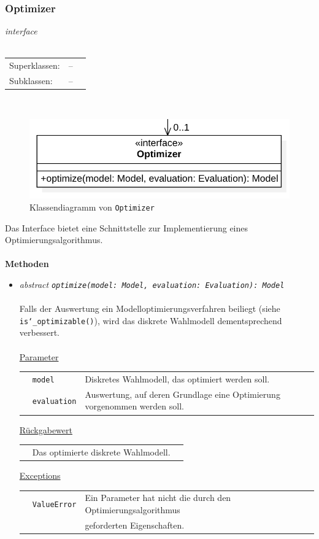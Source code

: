 \documentclass{article}
\begin{document}
\newpage
\subsubsection*{\large{\textbf{Optimizer}\label{cls:Optimizer}}}
\textit{\flqq{}interface\frqq}\normalsize\\\\
\begin{tabular}{lll}
 Superklassen: & --\\
 Subklassen: & --
\end{tabular}\\
\begin{figure}[H]%
    \centering
    \includegraphics[width=13cm]{entwurf/Entwurf_dokument/img/cls/model/Optimizer.png}
    \caption{Klassendiagramm von \texttt{Optimizer}}
\end{figure}

Das Interface bietet eine Schnittstelle zur Implementierung eines Optimierungsalgorithmus.
\\\\

\textbf{Methoden}
\begin{itemize}\setlength\itemsep{3em}
\item \textit{\flqq{}abstract\frqq} \texttt{\textit{optimize(model: Model, evaluation: Evaluation): Model}}\\\\
Falls der Auswertung ein Modelloptimierungsverfahren beiliegt (siehe \texttt{is\char`_optimizable()}), wird das diskrete Wahlmodell dementsprechend verbessert.\\\\
\underline{Parameter}\\
\begin{tabular}{lll}
 & \texttt{model} & Diskretes Wahlmodell, das optimiert werden soll.\\
 & \texttt{evaluation} & Auswertung, auf deren Grundlage eine Optimierung vorgenommen werden soll.
\end{tabular}

\underline{Rückgabewert}\\
\begin{tabular}{lll}
 & Das optimierte diskrete Wahlmodell.\\
\end{tabular}

\underline{Exceptions}\\
\begin{tabular}{lll}
 & \texttt{ValueError} & Ein Parameter hat nicht die durch den Optimierungsalgorithmus\\
 && geforderten Eigenschaften.\\
\end{tabular}
\end{itemize}
\end{document}
